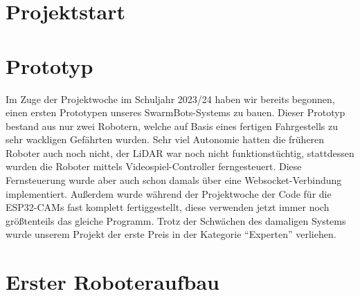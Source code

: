 \documentclass[12pt]{article}
\begin{document}
	\section{Projektstart}
	\section{Prototyp}
	Im Zuge der Projektwoche im Schuljahr 2023/24 haben wir bereits begonnen,
	einen ersten Prototypen unseres SwarmBots-Systems zu bauen.
	Dieser Prototyp bestand aus nur zwei Robotern,
	welche auf Basis eines fertigen Fahrgestells zu sehr wackligen Gefährten wurden.
	Sehr viel Autonomie hatten die früheren Roboter auch noch nicht,
	der LiDAR war noch nicht funktionstüchtig,
	stattdessen wurden die Roboter mittels Videospiel-Controller ferngesteuert.
	Diese Fernsteuerung wurde aber auch schon damals über eine Websocket-Verbindung implementiert.
	Außerdem wurde während der Projektwoche der Code für die ESP32-CAMs fast komplett fertiggestellt,
	diese verwenden jetzt immer noch größtenteils das gleiche Programm.
	Trotz der Schwächen des damaligen Systems wurde unserem Projekt
	der erste Preis in der Kategorie ``Experten'' verliehen.
	\section{Erster Roboteraufbau}
\end{document}
